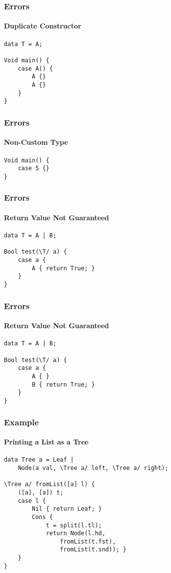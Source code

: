 \documentclass[12pt]{beamer}
\begin{document}
\begin{frame}[fragile]
    \frametitle{Errors}
    \framesubtitle{Duplicate Constructor}
    \begin{verbatim}
data T = A;

Void main() {
    case A() {
        A {}
        A {}
    }
}\end{verbatim}
\end{frame}

\begin{frame}[fragile]
    \frametitle{Errors}
    \framesubtitle{Non-Custom Type}
    \begin{verbatim}
Void main() {
    case 5 {}
}\end{verbatim}
\end{frame}

\begin{frame}[fragile]
    \frametitle{Errors}
    \framesubtitle{Return Value Not Guaranteed}
    \begin{verbatim}
data T = A | B;

Bool test(\T/ a) {
    case a {
        A { return True; }
    }
}\end{verbatim}
\end{frame}

\begin{frame}[fragile]
    \frametitle{Errors}
    \framesubtitle{Return Value Not Guaranteed}
    \begin{verbatim}
data T = A | B;

Bool test(\T/ a) {
    case a {
        A { }
        B { return True; }
    }
}\end{verbatim}
\end{frame}

\begin{frame}[fragile]
    \frametitle{Example}
    \framesubtitle{Printing a List as a Tree}
    \begin{verbatim}
data Tree a = Leaf |
    Node(a val, \Tree a/ left, \Tree a/ right);

\Tree a/ fromList([a] l) {
    ([a], [a]) t;
    case l {
        Nil { return Leaf; }
        Cons {
            t = split(l.tl);
            return Node(l.hd,
                fromList(t.fst),
                fromList(t.snd)); }
    }
}
\end{verbatim}
\end{frame}
\end{document}
